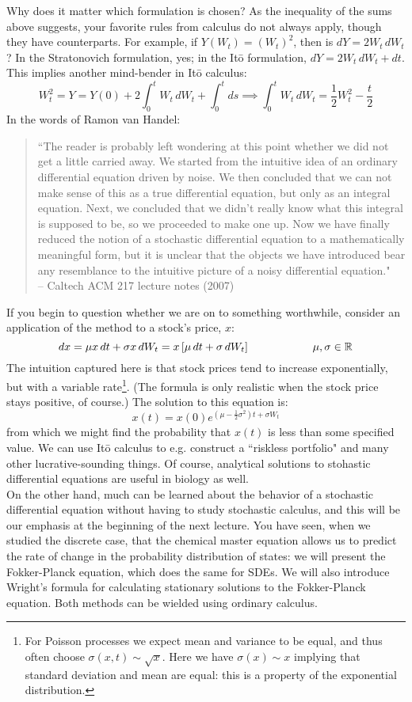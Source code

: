 \documentclass{article}
\begin{document}
Why does it matter which formulation is chosen? As the inequality of the sums above suggests, your favorite rules from calculus do not always apply, though they have counterparts. For example, if $Y(W_t)=(W_t)^2$, then is $dY = 2 W_t \, dW_t$? In the Stratonovich formulation, yes; in the It\={o} formulation, $dY = 2 W_t \, dW_t + dt$. This implies another mind-bender in It\={o} calculus:
\[ W_t^2 = Y = Y(0) + 2 \int_0^t W_t \, dW_t + \int_0^t ds \implies \int_0^t W_t \, dW_t  = \frac{1}{2} W_t^2 - \frac{t}{2} \] 
In the words of Ramon van Handel:
\begin{quote}
``The reader is probably left wondering at this point whether we did not get a little carried away. We started from the intuitive idea of an ordinary differential equation driven by noise. We then concluded that we can not make sense of this as a true differential equation, but only as an integral equation. Next, we concluded that we didn't really know what this integral is supposed to be, so we proceeded to make one up. Now we have finally reduced the notion of a stochastic differential equation to a mathematically meaningful form, but it is unclear that the objects we have introduced bear any resemblance to the intuitive picture of a noisy differential equation."\\
-- Caltech ACM 217 lecture notes (2007)
\end{quote}
If you begin to question whether we are on to something worthwhile, consider an application of the method to a stock's price, $x$:
\[ dx = \mu x \, dt  + \sigma x \, dW_t = x \left[ \mu \, dt + \sigma \, dW_t \right] \hspace{2 cm} \mu, \sigma \in \mathbb{R} \]
The intuition captured here is that stock prices tend to increase exponentially, but with a variable rate\footnote{For Poisson processes we expect mean and variance to be equal, and thus often choose $\sigma(x,t) \sim \sqrt{x}$. Here we have $\sigma(x)\sim x$ implying that standard deviation and mean are equal: this is a property of the exponential distribution.}. (The formula is only realistic when the stock price stays positive, of course.) The solution to this equation is:
\[ x(t) = x(0) e^{ \left( \mu - \frac{1}{2}\sigma^2 \right)t+\sigma W_t}\]
from which we might find the probability that $x(t)$ is less than some specified value. We can use It\={o} calculus to e.g. construct a ``riskless portfolio" and many other lucrative-sounding things. Of course, analytical solutions to stohastic differential equations are useful in biology as well.\\

On the other hand, much can be learned about the behavior of a stochastic differential equation without having to study stochastic calculus, and this will be our emphasis at the beginning of the next lecture. You have seen, when we studied the discrete case, that the chemical master equation allows us to predict the rate of change in the probability distribution of states: we will present the Fokker-Planck equation, which does the same for SDEs. We will also introduce Wright's formula for calculating stationary solutions to the Fokker-Planck equation. Both methods can be wielded using ordinary calculus.
\end{document}

